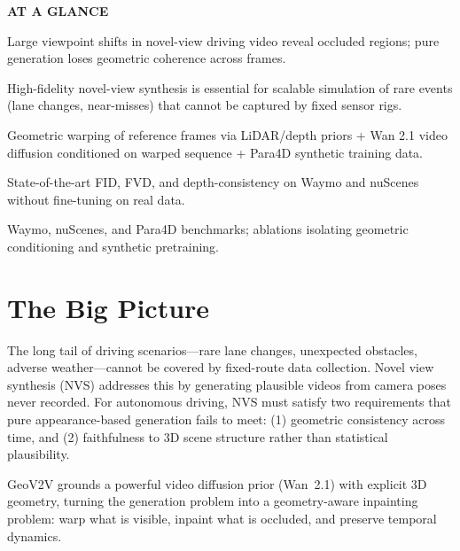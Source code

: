 \documentclass[10pt,twocolumn]{article}
\begin{document}
\begin{mdframed}[backgroundcolor=boxgray,linecolor=rulered,linewidth=1pt,
    innerleftmargin=6pt,innerrightmargin=6pt,
    innertopmargin=6pt,innerbottommargin=6pt]
\textbf{\small AT A GLANCE}\par\vspace{4pt}
\begin{description}[leftmargin=0pt,labelsep=4pt,itemsep=2pt,parsep=0pt,
    font=\small\bfseries]
  \item[Problem:] Large viewpoint shifts in novel-view driving video
    reveal occluded regions; pure generation loses geometric coherence
    across frames.
  \item[Why it matters:] High-fidelity novel-view synthesis is essential
    for scalable simulation of rare events (lane changes, near-misses)
    that cannot be captured by fixed sensor rigs.
  \item[Method:] Geometric warping of reference frames via LiDAR/depth
    priors + Wan 2.1 video diffusion conditioned on warped sequence +
    Para4D synthetic training data.
  \item[Result:] State-of-the-art FID, FVD, and depth-consistency on
    Waymo and nuScenes without fine-tuning on real data.
  \item[Evidence:] Waymo, nuScenes, and Para4D benchmarks; ablations
    isolating geometric conditioning and synthetic pretraining.
\end{description}
\end{mdframed}

\section{The Big Picture}

The long tail of driving scenarios---rare lane changes, unexpected
obstacles, adverse weather---cannot be covered by fixed-route data
collection. Novel view synthesis (NVS) addresses this by generating
plausible videos from camera poses never recorded. For autonomous
driving, NVS must satisfy two requirements that pure appearance-based
generation fails to meet: (1) geometric consistency across time, and
(2) faithfulness to 3D scene structure rather than statistical plausibility.

GeoV2V grounds a powerful video diffusion prior (Wan~2.1) with
explicit 3D geometry, turning the generation problem into a
geometry-aware inpainting problem: warp what is visible, inpaint
what is occluded, and preserve temporal dynamics.
\end{document}
